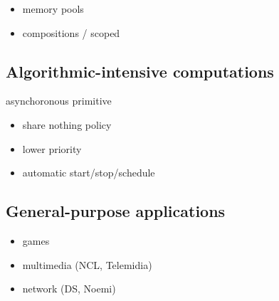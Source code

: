\documentclass[pdftex,12pt,a4paper]{article}
\begin{document}
\begin{itemize}
    \item memory pools
    \item compositions / scoped
\end{itemize}

\subsection{Algorithmic-intensive computations}

asynchoronous primitive

\begin{itemize}
    \item share nothing policy
    \item lower priority
    \item automatic start/stop/schedule
\end{itemize}

\subsection{General-purpose applications}

\begin{itemize}
    \item games
    \item multimedia (NCL, Telemidia)
    \item network (DS, Noemi)
\end{itemize}
\end{document}
